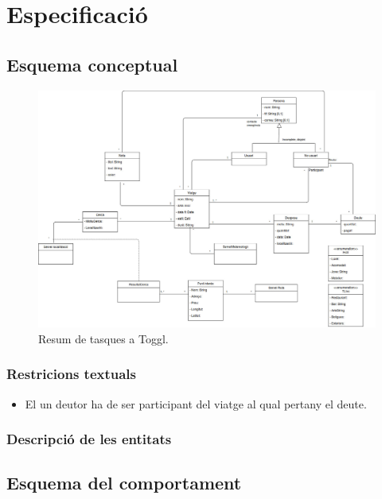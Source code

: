 
\chapter{Especificació} %

\label{Especificacio} %

\section{Esquema conceptual}


\begin{figure}[!h]
\centering
\includegraphics[scale=0.3]{Figures/UML.jpg}
\caption{Resum de tasques a Toggl.}
\end{figure}


\subsection{Restricions textuals}
\begin{itemize}
\item{}El un deutor ha de ser participant del viatge al qual pertany el deute.

\end{itemize}

\subsection{Descripció de les entitats}

\section{Esquema del comportament}

